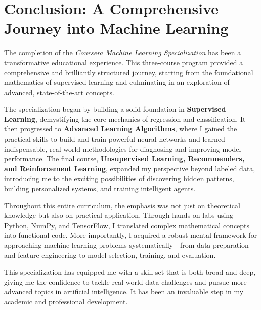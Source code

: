 
\section{Conclusion: A Comprehensive Journey into Machine Learning}

\indent\indent The completion of the \textit{Coursera Machine Learning Specialization} has been a transformative educational experience. This three-course program provided a comprehensive and brilliantly structured journey, starting from the foundational mathematics of supervised learning and culminating in an exploration of advanced, state-of-the-art concepts.

The specialization began by building a solid foundation in \textbf{Supervised Learning}, demystifying the core mechanics of regression and classification. It then progressed to \textbf{Advanced Learning Algorithms}, where I gained the practical skills to build and train powerful neural networks and learned indispensable, real-world methodologies for diagnosing and improving model performance. The final course, \textbf{Unsupervised Learning, Recommenders, and Reinforcement Learning}, expanded my perspective beyond labeled data, introducing me to the exciting possibilities of discovering hidden patterns, building personalized systems, and training intelligent agents.

Throughout this entire curriculum, the emphasis was not just on theoretical knowledge but also on practical application. Through hands-on labs using Python, NumPy, and TensorFlow, I translated complex mathematical concepts into functional code. More importantly, I acquired a robust mental framework for approaching machine learning problems systematically—from data preparation and feature engineering to model selection, training, and evaluation.

This specialization has equipped me with a skill set that is both broad and deep, giving me the confidence to tackle real-world data challenges and pursue more advanced topics in artificial intelligence. It has been an invaluable step in my academic and professional development.
